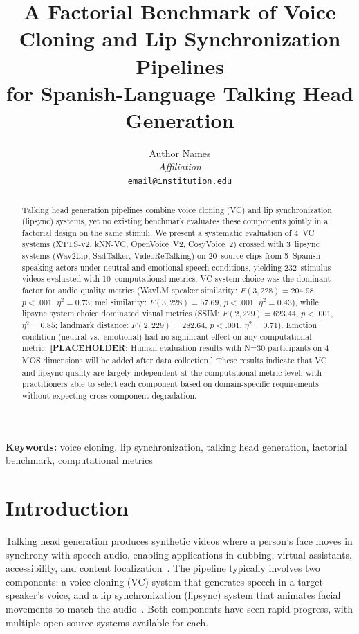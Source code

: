 \documentclass[11pt,a4paper]{article}
\title{A Factorial Benchmark of Voice Cloning and Lip Synchronization Pipelines\\for Spanish-Language Talking Head Generation}
\author{Author Names\\
\textit{Affiliation}\\
\texttt{email@institution.edu}}
\date{}
\newcommand{\placeholder}[1]{\textcolor{red!70!black}{\textbf{[PLACEHOLDER:} #1\textbf{]}}}
\begin{document}
\maketitle

\begin{abstract}
Talking head generation pipelines combine voice cloning (VC) and lip synchronization (lipsync) systems, yet no existing benchmark evaluates these components jointly in a factorial design on the same stimuli.
We present a systematic evaluation of 4~VC systems (XTTS-v2, kNN-VC, OpenVoice~V2, CosyVoice~2) crossed with 3~lipsync systems (Wav2Lip, SadTalker, VideoReTalking) on 20~source clips from 5~Spanish-speaking actors under neutral and emotional speech conditions, yielding 232~stimulus videos evaluated with 10~computational metrics.
VC system choice was the dominant factor for audio quality metrics (WavLM speaker similarity: $F(3,228)=204.98$, $p<.001$, $\eta^2=0.73$; mel similarity: $F(3,228)=57.69$, $p<.001$, $\eta^2=0.43$), while lipsync system choice dominated visual metrics (SSIM: $F(2,229)=623.44$, $p<.001$, $\eta^2=0.85$; landmark distance: $F(2,229)=282.64$, $p<.001$, $\eta^2=0.71$).
Emotion condition (neutral vs.\ emotional) had no significant effect on any computational metric.
\placeholder{Human evaluation results with N=30 participants on 4 MOS dimensions will be added after data collection.}
These results indicate that VC and lipsync quality are largely independent at the computational metric level, with practitioners able to select each component based on domain-specific requirements without expecting cross-component degradation.
\end{abstract}

\textbf{Keywords:} voice cloning, lip synchronization, talking head generation, factorial benchmark, computational metrics

\section{Introduction}
\label{sec:introduction}

Talking head generation produces synthetic videos where a person's face moves in synchrony with speech audio, enabling applications in dubbing, virtual assistants, accessibility, and content localization~\citep{survey2025thg}.
The pipeline typically involves two components: a voice cloning (VC) system that generates speech in a target speaker's voice, and a lip synchronization (lipsync) system that animates facial movements to match the audio~\citep{survey2025vc}.
Both components have seen rapid progress, with multiple open-source systems available for each.
\end{document}
